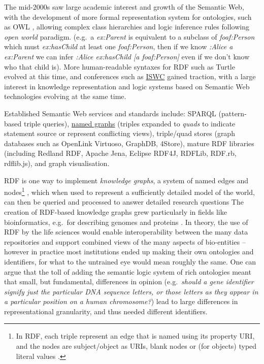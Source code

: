The mid-2000s saw large academic interest and growth of the Semantic Web, with the development of more formal representation system for ontologies, such as OWL \cite{w3-owl2-overview}, allowing complex class hierarchies and logic inference rules following \emph{open world} paradigm. (e.g.~a \emph{ex:Parent} is equivalent to a subclass of \emph{foaf:Person} which must \emph{ex:hasChild} at least one \emph{foaf:Person}, then if we know \emph{:Alice a ex:Parent} we can infer \emph{:Alice ex:hasChild {[}a foaf:Person{]}} even if we don't know who that child is). More human-readable syntaxes for RDF such as Turtle evolved at this time, and conferences such as \href{https://iswc2022.semanticweb.org/}{ISWC} \cite{horrocksSemanticWebISWC2002} gained traction, with a large interest in knowledge representation and logic systems based on Semantic Web technologies evolving at the same time.

Established Semantic Web services and standards include: SPARQL \cite{w3-sparql11-overview} (pattern-based triple queries), \href{https://www.w3.org/TR/rdf11-concepts/\#section-dataset}{named graphs} \cite{w3-rdf11-concepts} (triples expanded to \emph{quads} to indicate statement source or represent conflicting views), triple/quad stores (graph databases such as OpenLink Virtuoso, GraphDB, 4Store), mature RDF libraries (including Redland RDF, Apache Jena, Eclipse RDF4J, RDFLib, RDF.rb, rdflib.js), and graph visualisation.

RDF is one way to implement \emph{knowledge graphs}, a system of named edges and nodes\footnote{In RDF, each triple represent an edge that is named using its property URI, and the nodes are subject/object as URIs, blank nodes or (for objects) typed literal values \cite{w3-rdf11-primer}.} \cite{nurdiati2008}, which when used to represent a sufficiently detailed model of the world, can then be queried and processed to answer detailed research questions
The creation of RDF-based knowledge graphs grew particularly in fields like bioinformatics, e.g.~for describing genomes and proteins \cite{gobleStateNationData2008c,williamsOpenPHACTSSemantic2012c}. In theory, the use of RDF by the life sciences would enable interoperability between the many data repositories and support combined views of the many aspects of bio-entities -- however in practice most institutions ended up making their own ontologies and identifiers, for what to the untrained eye would mean roughly the same. One can argue that the toll of adding the semantic logic system of rich ontologies meant that small, but fundamental, differences in opinion (e.g.~\emph{should a gene identifier signify just the particular DNA sequence letters, or those letters as they appear in a particular position on a human chromosome?}) lead to large differences in representational granularity, and thus needed different identifiers.

